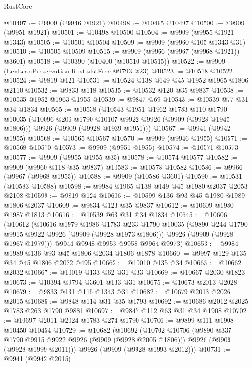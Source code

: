 \begin{lexlean}{RustCore}
\begin{coremodule}
@10497 := @9909 (@9946 @1921)
@10498 := @10495 @10497
@10500 := @9909 (@9951 @1921)
@10501 := @10498 @10500
@10504 := @9909 (@9955 @1921 @1343)
@10505 := @10501 @10504
@10509 := @9909 (@9960 @105 @1343 @31)
@10510 := @10505 @10509
@10515 := @9909 (@9966 (@9967 (@9968 @1921)) @3601)
@10518 := @10390 (@10400 (@10510 @10515))
@10522 := @9909 (LexLeanPreservation.Rust.slotFree @9793 @23)
@10523 := @10518 @10522
@10524 := @9819 @121
@10531 := @10524 @138 @149 @45 @1952 @1965 @1806 @2110
@10532 := @9833 @118
@10535 := @10532 @120 @35 @9837
@10538 := @10535 @1952 @1963 @1955
@10539 := @9847 @69
@10543 := @10539 @77 @31 @34 @1834
@10565 := @10538
    (@10543
      @1951
      @1962
      @1783
      @110
      @1790
      @10035
      (@10096 @206 @1790 @10107 @9922 @9926 (@9909 (@9928 @1945 @1806)))
      @9926
      (@9909 (@9928 @1939 @1951)))
@10567 := @9941 (@9942 @1955)
@10568 := @10565 @10567
@10570 := @9909 (@9946 @1955)
@10571 := @10568 @10570
@10573 := @9909 (@9951 @1955)
@10574 := @10571 @10573
@10577 := @9909 (@9955 @1955 @35)
@10578 := @10574 @10577
@10582 := @9909 (@9960 @118 @35 @9837)
@10583 := @10578 @10582
@10586 := @9966 (@9967 (@9968 @1955))
@10588 := @9909 (@10586 @3601)
@10590 := @10531 (@10583 @10588)
@10598 := @9984 @1965 @138 @149 @45 @1980 @2037 @2053 @2108
@10599 := @9819 @124
@10606 := @10599 @136 @93 @45 @1980 @1989 @1806 @2037
@10609 := @9834 @123 @35 @9837
@10612 := @10609 @1980 @1987 @1813
@10616 := @10539 @63 @31 @34 @1834
@10645 := @10606
    (@10612
      (@10616
        @1979
        @1986
        @1783
        @233
        @1790
        @10035
        (@9890 @244 @1790 @9915 @9922 @9926 (@9909 (@9928 @1973 @1806)))
        @9926
        (@9909 (@9928 @1967 @1979)))
      @9944
      @9948
      @9953
      @9958
      @9964
      @9973)
@10653 := @9984 @1989 @136 @93 @45 @1806 @2034 @1806 @1878
@10660 := @9997 @129 @135 @34 @45 @1806 @2032 @495
@10662 := @10010 @135 @34
@10663 := @10662 @2032
@10667 := @10019 @133 @62 @31 @33
@10669 := @10667 @2030 @1823
@10673 := @10394 @9794 @3601 @133 @31
@10675 := @10673 @2013 @2028
@10679 := @9833 @131 @115 @1343 @31
@10682 := @10679 @2013 @2026 @2015
@10686 := @9848 @114 @31 @35 @1793
@10692 := @10686 @2012 @2025 @1783 @263 @1790 @9881
@10697 := @9847 @112 @63 @31 @34 @1908
@10702 := @10697 @2011 @2024 @1783 @274 @1790
@10706 := @9899 @111 @1908 @10450 @10454
@10729 := @10682
    (@10692
      (@10702
        @10706
        (@9890 @337 @1790 @9915 @9922 @9926 (@9909 (@9928 @2005 @1806)))
        @9926
        (@9909 (@9928 @1999 @2011)))
      @9926
      (@9909 (@9928 @1993 @2012)))
@10731 := @9941 (@9942 @2015)

\end{coremodule}
\end{lexlean}

